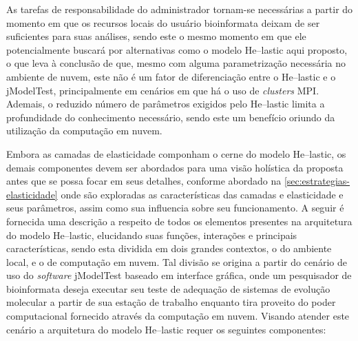 \documentclass[english,brazilian]{UNISINOSmonografia} %
\begin{document}
As tarefas de responsabilidade do administrador tornam-se necessárias a partir do momento em que os recursos locais do usuário bioinformata deixam de ser suficientes para suas análises, sendo este o mesmo momento em que ele potencialmente buscará por alternativas como o modelo \textsf{He}--lastic aqui proposto, o que leva à conclusão de que, mesmo com alguma parametrização necessária no ambiente de nuvem, este não é um fator de diferenciação entre o \textsf{He}--lastic e o jModelTest, principalmente em cenários em que há o uso de \textit{clusters} MPI.
Ademais, o reduzido número de parâmetros exigidos pelo \textsf{He}--lastic limita a profundidade do conhecimento necessário, sendo este um benefício oriundo da utilização da computação em nuvem.


Embora as camadas de elasticidade componham o cerne do modelo \textsf{He}--lastic, os demais componentes devem ser abordados para uma visão holística da proposta antes que se possa focar em seus detalhes, conforme abordado na \autoref{sec:estrategias-elasticidade} onde são exploradas as características das camadas e elasticidade e seus parâmetros, assim como sua influencia sobre seu funcionamento.
A seguir é fornecida uma descrição a respeito de todos os elementos presentes na arquitetura do modelo \textsf{He}--lastic, elucidando suas funções, interações e principais características, sendo esta dividida em dois grandes contextos, o do ambiente local, e o de computação em nuvem.
Tal divisão se origina a partir do cenário de uso do \textit{software} jModelTest baseado em interface gráfica, onde um pesquisador de bioinformata deseja executar seu teste de adequação de sistemas de evolução molecular a partir de sua estação de trabalho enquanto tira proveito do poder computacional fornecido através da computação em nuvem.
Visando atender este cenário a arquitetura do modelo \textsf{He}--lastic requer os seguintes componentes:
\end{document}
